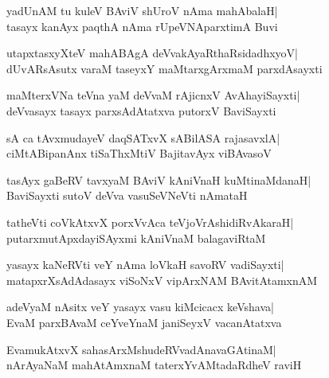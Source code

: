 \documentclass[twoside,12pt,openright]{book}
\newcounter{shloka}[chapter]
\begin{document}
\begin{shloka}%
yadUnAM tu kuleV BAviV shUroV nAma mahAbalaH|\\
tasayx kanAyx paqthA nAma rUpeVNAparxtimA Buvi
\end{shloka}

\begin{shloka}%
utapxtasxyXteV mahABAgA deVvakAyaRthaRsidadhxyoV|\\
dUvARsAsutx varaM taseyxY maMtarxgArxmaM parxdAsayxti
\end{shloka}

\begin{shloka}%
maMterxVNa teVna yaM deVvaM rAjicnxV AvAhayiSayxti|\\
deVvasayx tasayx parxsAdAtatxva putorxV BaviSayxti
\end{shloka}

\begin{shloka}%
sA ca tAvxmudayeV daqSATxvX sABilASA rajasavxlA|\\
ciMtABipanAnx tiSaThxMtiV BajitavAyx viBAvasoV
\end{shloka}

\begin{shloka}%
tasAyx gaBeRV tavxyaM BAviV kAniVnaH kuMtinaMdanaH|\\
BaviSayxti sutoV deVva vasuSeVNeVti nAmataH
\end{shloka}

\begin{shloka}%
tatheVti coVkAtxvX porxVvAca teVjoVrAshidiRvAkaraH|\\
putarxmutApxdayiSAyxmi kAniVnaM balagaviRtaM
\end{shloka}

\begin{shloka}%
yasayx kaNeRVti veY nAma loVkaH savoRV vadiSayxti|\\
matapxrXsAdAdasayx viSoNxV vipArxNAM BAvitAtamxnAM
\end{shloka}

\begin{shloka}%
adeVyaM nAsitx veY yasayx vasu kiMcicacx keVshava|\\
EvaM parxBAvaM ceYveYnaM janiSeyxV vacanAtatxva
\end{shloka}

\begin{shloka}%
EvamukAtxvX sahasArxMshudeRVvadAnavaGAtinaM|\\
nArAyaNaM mahAtAmxnaM taterxYvAMtadaRdheV raviH
\end{shloka}
\end{document}
